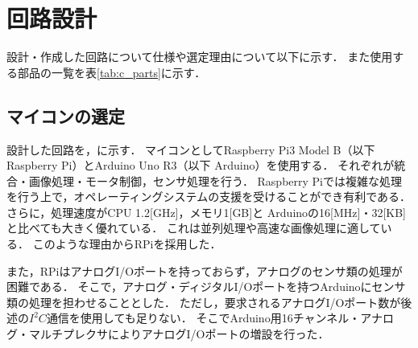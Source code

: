 \documentclass[11pt,a4]{jsarticle}
\begin{document}

\section{回路設計}  %

  設計・作成した回路について仕様や選定理由について以下に示す．
  また使用する部品の一覧を表\ref{tab:c_parts}に示す．

  \subsection{マイコンの選定}
    設計した回路を，に示す．
    マイコンとしてRaspberry Pi3 Model B（以下 Raspberry Pi）とArduino Uno R3（以下 Arduino）を使用する．
    それぞれが統合・画像処理・モータ制御，センサ処理を行う．
    Raspberry Piでは複雑な処理を行う上で，オペレーティングシステムの支援を受けることができ有利である．
    さらに，処理速度がCPU 1.2[GHz]，メモリ1[GB]と
    Arduinoの16[MHz]・32[KB]と比べても大きく優れている．
    これは並列処理や高速な画像処理に適している．
    このような理由からRPiを採用した．

    また，RPiはアナログI/Oポートを持っておらず，アナログのセンサ類の処理が困難である．
    そこで，アナログ・ディジタルI/Oポートを持つArduinoにセンサ類の処理を担わせることとした．
    ただし，要求されるアナログI/Oポート数が後述の$I^2 C$通信を使用しても足りない．
    そこでArduino用16チャンネル・アナログ・マルチプレクサによりアナログI/Oポートの増設を行った．
\end{document}
